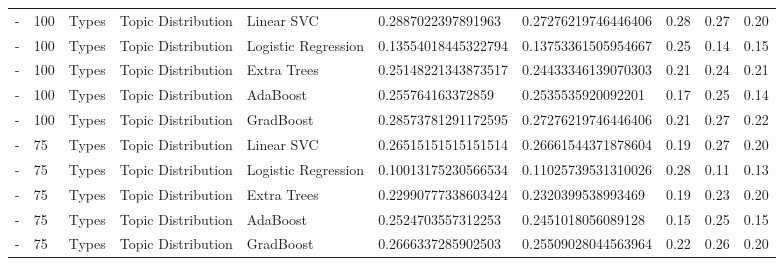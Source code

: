\begin{table}[]
\begin{tabular}{@{}llllllllll@{}}
    -                   & 100             & Types                 & Topic Distribution    & Linear SVC          & 0.2887022397891963      & 0.27276219746446406    & 0.28               & 0.27            & 0.20              \\
    -                   & 100             & Types                 & Topic Distribution    & Logistic Regression & 0.13554018445322794     & 0.13753361505954667    & 0.25               & 0.14            & 0.15              \\
    -                   & 100             & Types                 & Topic Distribution    & Extra Trees         & 0.25148221343873517     & 0.24433346139070303    & 0.21               & 0.24            & 0.21              \\
    -                   & 100             & Types                 & Topic Distribution    & AdaBoost            & 0.255764163372859       & 0.2535535920092201     & 0.17               & 0.25            & 0.14              \\
    -                   & 100             & Types                 & Topic Distribution    & GradBoost           & 0.28573781291172595     & 0.27276219746446406    & 0.21               & 0.27            & 0.22              \\
    -                   & 75              & Types                 & Topic Distribution    & Linear SVC          & 0.26515151515151514     & 0.26661544371878604    & 0.19               & 0.27            & 0.20              \\
    -                   & 75              & Types                 & Topic Distribution    & Logistic Regression & 0.10013175230566534     & 0.11025739531310026    & 0.28               & 0.11            & 0.13              \\
    -                   & 75              & Types                 & Topic Distribution    & Extra Trees         & 0.22990777338603424     & 0.2320399538993469     & 0.19               & 0.23            & 0.20              \\
    -                   & 75              & Types                 & Topic Distribution    & AdaBoost            & 0.2524703557312253      & 0.2451018056089128     & 0.15               & 0.25            & 0.15              \\
    -                   & 75              & Types                 & Topic Distribution    & GradBoost           & 0.2666337285902503      & 0.25509028044563964    & 0.22               & 0.26            & 0.20              \\

\end{tabular}
\end{table}
